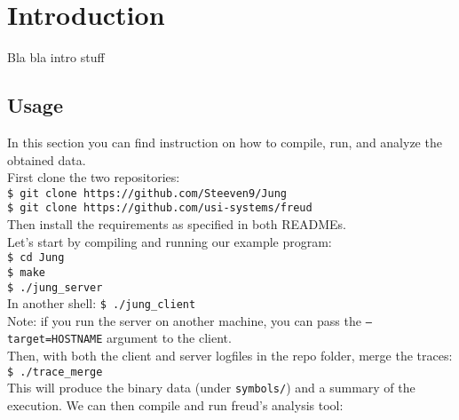 \chapter{Introduction}

    Bla bla intro stuff

    \section{Usage}

        In this section you can find instruction on how to compile, run, and analyze the obtained data.\\

        First clone the two repositories:\\
        
        \texttt{\$ git clone https://github.com/Steeven9/Jung}\\

        \texttt{\$ git clone https://github.com/usi-systems/freud}\\

        Then install the requirements as specified in both READMEs.\\

        Let's start by compiling and running our example program:\\

        \texttt{\$ cd Jung}\\

        \texttt{\$ make}\\

        \texttt{\$ ./jung\_server}\\
        
        In another shell: \texttt{\$ ./jung\_client}\\

        Note: if you run the server on another machine, you can pass the \texttt{---target=HOSTNAME}
        argument to the client.\\

        Then, with both the client and server logfiles in the repo folder, merge the traces:\\

        \texttt{\$ ./trace\_merge}\\

        This will produce the binary data (under \texttt{symbols/}) and a summary of the execution.
        We can then compile and run freud's analysis tool:\\

